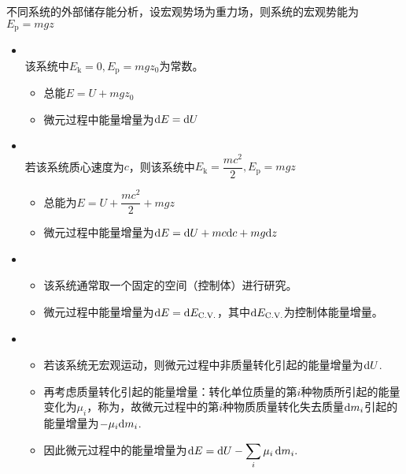 \newpage
\noindent 不同系统的外部储存能分析，设宏观势场为重力场，则系统的宏观势能为$E_{\text{p}}=mgz$
\begin{itemize}
	\item {}\\
	该系统中$E_{\text{k}} = 0, E_{\text{p}}=mgz_0$为常数。
	\vspace*{-0.5em}
	\begin{itemize}
		\item 总能$E=U+mgz_0$
		\item 微元过程中能量增量为${\rm{d}} E = {\rm{d}} U$
	\end{itemize}
	\item {}\\
	若该系统质心速度为$c$，则该系统中$E_{\text{k}}=\dfrac{mc^2}{2}, E_{\text{p}} = mgz$
	\vspace*{-0.5em}
	\begin{itemize}
		\item 总能为$E = U + \dfrac{mc^2}{2} + mgz$
		\item 微元过程中能量增量为${\rm{d}} E = {\rm{d}} U + mc{\rm{d}} c + mg {\rm{d}} z$
	\end{itemize}
	\item {}
	\begin{itemize}
		\item 该系统通常取一个固定的空间（控制体）进行研究。
		\item 微元过程中能量增量为${\rm{d}} E = {\rm{d}} E_{\text{C.V.}}$，其中${\rm{d}} E_{\text{C.V.}}$为控制体能量增量。
	\end{itemize}
	\item {}
	\begin{itemize}
		\item 若该系统无宏观运动，则微元过程中非质量转化引起的能量增量为${\rm{d}} U$.
		\item 再考虑质量转化引起的能量增量：转化单位质量的第$i$种物质所引起的能量变化为$\mu_i$，称为，故微元过程中的第$i$种物质质量转化失去质量${\rm{d}} m_i$引起的能量增量为$-\mu_i {\rm{d}} m_i$.
		\item 因此微元过程中的能量增量为$\displaystyle {\rm{d}} E = {\rm{d}} U - \sum_i\mu_i \,{\rm{d}} m_i.$
	\end{itemize}
\end{itemize}

